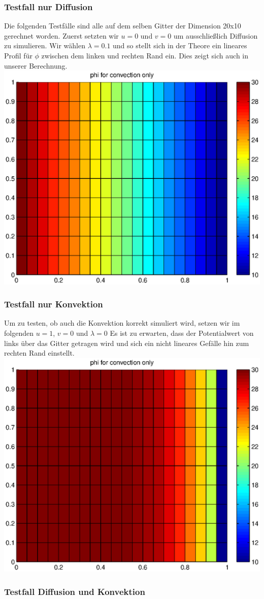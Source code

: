 \documentclass{article}
\begin{document}
\subsubsection{Testfall nur Diffusion}
Die folgenden Testfälle sind alle auf dem selben Gitter der Dimension 20x10 gerechnet worden.
Zuerst setzten wir  $u=0$ und $v=0$ um ausschließlich Diffusion zu simulieren. Wir wählen $\lambda=0.1$ und so stellt
sich in der Theore ein lineares Profil für $\phi$ zwischen dem linken und rechten Rand ein.
Dies zeigt sich auch in unserer Berechnung. \\
\includegraphics[scale=0.5]{test/5conv/diffusiononly.eps}


\subsubsection{Testfall nur Konvektion}
Um zu testen, ob auch die Konvektion korrekt simuliert wird, setzen wir im folgenden $u=1$, $v=0$ und $\lambda=0$
Es ist zu erwarten, dass der Potentialwert von links über das Gitter getragen wird und sich ein nicht lineares Gefälle hin 
zum rechten Rand einstellt.\\
\includegraphics[scale=0.5]{test/5conv/convonly.eps}


\subsubsection{Testfall Diffusion und Konvektion}
\end{document}
